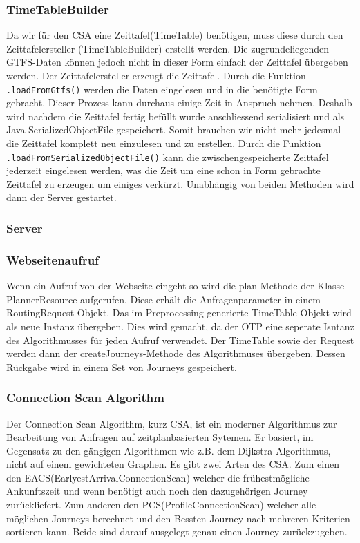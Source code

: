 \subsubsection{TimeTableBuilder}
Da wir für den CSA eine Zeittafel(TimeTable) benötigen, muss diese durch den Zeittafelersteller (TimeTableBuilder) erstellt werden. Die zugrundeliegenden GTFS-Daten können jedoch nicht in dieser Form einfach der Zeittafel übergeben werden. Der Zeittafelersteller erzeugt die Zeittafel. Durch die Funktion \texttt{.loadFromGtfs()} werden die Daten eingelesen und in die benötigte Form gebracht. Dieser Prozess kann durchaus einige Zeit in Anspruch nehmen. Deshalb wird nachdem die Zeittafel fertig befüllt wurde anschliessend serialisiert und als Java-SerializedObjectFile gespeichert. Somit brauchen wir nicht mehr jedesmal die Zeittafel komplett neu einzulesen und zu erstellen. Durch die Funktion \texttt{.loadFromSerializedObjectFile()} kann die zwischengespeicherte Zeittafel jederzeit eingelesen werden, was die Zeit um eine schon in Form gebrachte Zeittafel zu erzeugen um einiges verkürzt. Unabhängig von beiden Methoden wird dann der Server gestartet.

\subsubsection{Server}
\subsubsection{Webseitenaufruf}
Wenn ein Aufruf von der Webseite eingeht so wird die plan Methode der Klasse PlannerResource aufgerufen. Diese erhält die Anfragenparameter in einem RoutingRequest-Objekt. Das im Preprocessing generierte TimeTable-Objekt wird als neue Instanz übergeben. Dies wird gemacht, da der OTP eine seperate Isntanz des Algorithmusses für jeden Aufruf verwendet. Der TimeTable sowie der Request werden dann der createJourneys-Methode des Algorithmuses übergeben. Dessen Rückgabe wird in einem Set von Journeys gespeichert.

\subsubsection{Connection Scan Algorithm}
Der Connection Scan Algorithm, kurz CSA,  ist ein moderner Algorithmus zur Bearbeitung von Anfragen auf zeitplanbasierten Sytemen. Er basiert, im Gegensatz zu den gängigen Algorithmen wie z.B. dem Dijkstra-Algorithmus, nicht auf einem gewichteten Graphen. 
Es gibt zwei Arten des CSA. Zum einen den EACS(EarlyestArrivalConnectionScan) welcher die frühestmögliche Ankunftszeit und wenn benötigt auch noch den dazugehörigen Journey zurückliefert. Zum anderen den PCS(ProfileConnectionScan) welcher alle möglichen Journeys berechnet und den Bessten Journey nach mehreren Kriterien sortieren kann. Beide sind darauf ausgelegt genau einen Journey zurückzugeben.

